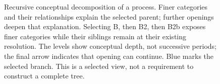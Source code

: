 \begin{figure}[!htbp]
\caption{Recursive conceptual decomposition of a process. Finer categories and
their relationships explain the selected parent; further openings deepen that
explanation. Selecting B, then B2, then B2b exposes finer categories while their
siblings remain at their existing resolution. The levels show conceptual depth, not successive periods;
the final arrow indicates that opening can continue. Blue marks the selected
branch. This is a selected view, not a requirement to construct a complete tree.}
\label{fig:conceptual-decomposition}
\end{figure}
